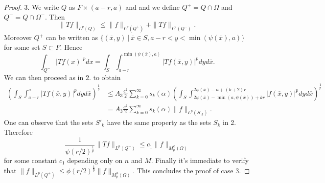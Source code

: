 \documentclass[12pt]{article}
\theoremstyle{definition}
\begin{document}
\begin{proof}
3. We write $Q$ as $F \times (a-r,a)$ and and we define $Q^+=Q\cap\Omega$ and $Q^-=Q\cap\Omega^-.$ Then 
\[\|Tf\|_{L^p(Q)}\le\|f\|_{L^p(Q^+)}+\|Tf\|_{L^p(Q^-)}.\]
Moreover $Q^+$ can be written as $\{ (\overline x, y) \ | \ \overline x \in S, a-r<y<\min(\psi(\overline x),a)\}$ for some set $S \subset F.$ Hence
\[ \int_{Q^-} |Tf(x)|^pdx = \int_S \int_{a-r}^{\min(\psi(\overline x),a)} |Tf(\overline x,y)|^pdy d\overline x. \]
We can then proceed as in 2. to obtain
\begin{align*}
 \left(\int_S\int_{a-r}^{a}|Tf(\overline x,y)|^p dy d\overline x\right)^{\frac{1}{p}} &\le A_3\frac{c^2}{2} \sum_{k=0}^\infty s_k(\alpha) \left (\int_S \int_{2\psi(\overline x) -\min(a,\psi(\overline x)) +kr}^{2\psi(\overline x) -a+(k+2)r}|f(\overline x, y)|^p  dy d\overline x\right) ^{\frac{1}{p}}\\
 &=A_3\frac{c^2}{2} \sum_{k=0}^\infty s_k(\alpha) \|f\|_{L^p(S'_k)}.
 \end{align*}
One can observe that the sets $S'_k$ have the same property as the sets $S_k$ in 2. Therefore
\[ \frac{1}{\psi(r/2)^{\frac{1}{p}}} \| Tf\|_{L^p(Q^-)} \le c_1 \| f\|_{M_p^\phi(\Omega)} \]
for some constant $c_1$ depending only on $n$ and $M$. Finally it's immediate to verify that $\| f\|_{L^p(Q^+)} \le \phi(r/2)^{\frac{1}{p}} \| f\|_{M_p^\phi(\Omega)}.$ This concludes the proof of case 3.


\end{proof}
\end{document}
